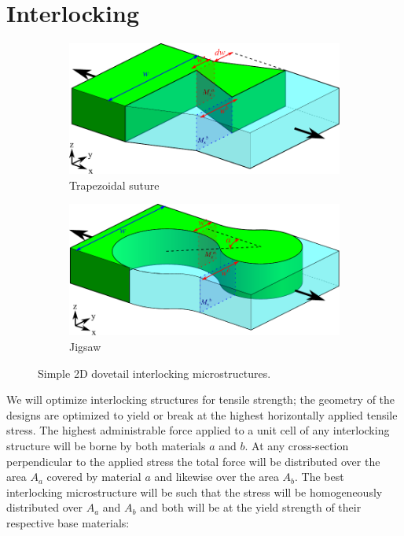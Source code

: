 \section{Interlocking}


\begin{figure}
	\centering
	\begin{subfigure}{.49\columnwidth}
		\includegraphics{sources/method/suture_model_v5.pdf}
		\caption{Trapezoidal suture}
		\label{fig:suture}
	\end{subfigure}
	\begin{subfigure}{.49\columnwidth}
		\includegraphics{sources/method/jigsaw_model_v5.pdf}
		\caption{Jigsaw}
		\label{fig:jigsaw}
	\end{subfigure}
	\caption{Simple 2D dovetail interlocking microstructures.}
	\label{fig:suture_jigsaw}
\end{figure}



We will optimize interlocking structures for tensile strength;
the geometry of the designs are optimized to yield or break at the highest horizontally applied tensile stress.
The highest administrable force applied to a unit cell of any interlocking structure will be borne by both materials $a$ and $b$.
At any cross-section perpendicular to the applied stress the total force will be distributed over the area $A_a$ covered by material $a$ and likewise over the area $A_b$.
The best interlocking microstructure will be such that the stress will be homogeneously distributed over $A_a$ and $A_b$ and both will be at the yield strength of their respective base materials:

